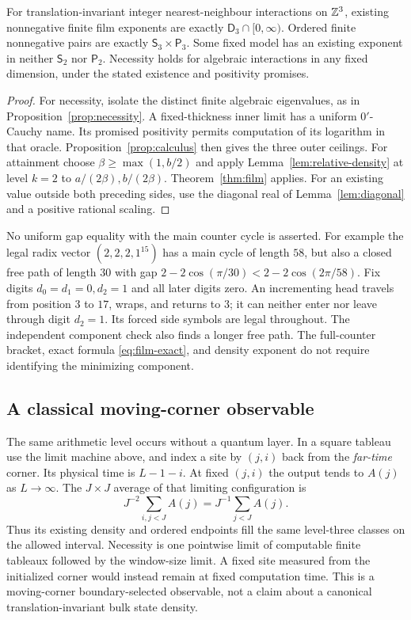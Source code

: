 \begin{corollary}\label{cor:film-classification}
For translation-invariant integer nearest-neighbour interactions on
$\mathbb Z^3$, existing nonnegative finite film exponents are exactly
$\mathsf D_3\cap[0,\infty)$. Ordered finite nonnegative pairs are
exactly $\mathsf S_3\times\mathsf P_3$. Some fixed model has an
existing exponent in neither $\mathsf S_2$ nor $\mathsf P_2$.
Necessity holds for algebraic interactions in any fixed dimension,
under the stated existence and positivity promises.
\end{corollary}
\begin{proof}
For necessity, isolate the distinct finite algebraic eigenvalues, as
in Proposition~\ref{prop:necessity}. A fixed-thickness inner limit has
a uniform $0'$-Cauchy name. Its promised positivity permits computation
of its logarithm in that oracle. Proposition~\ref{prop:calculus}
then gives the three outer ceilings. For attainment choose
$\beta\geq\max(1,b/2)$ and apply Lemma~\ref{lem:relative-density} at
level $k=2$ to $a/(2\beta),b/(2\beta)$. Theorem~\ref{thm:film} applies.
For an existing value outside both preceding sides, use the diagonal
real of Lemma~\ref{lem:diagonal} and a positive rational scaling.
\end{proof}

No uniform gap equality with the main counter cycle is asserted.
For example the legal radix vector $(2,2,2,1^{15})$ has a main cycle
of length $58$, but also a closed free path of length $30$ with gap
$2-2\cos(\pi/30)<2-2\cos(2\pi/58)$. Fix digits
$d_0=d_1=0,d_2=1$ and all later digits zero. An incrementing head
travels from position $3$ to $17$, wraps, and returns to $3$; it can
neither enter nor leave through digit $d_2=1$. Its forced side symbols
are legal throughout. The independent component check also finds a
longer free path. The full-counter bracket, exact formula
\eqref{eq:film-exact}, and density exponent do not require identifying
the minimizing component.

\subsection{A classical moving-corner observable}
The same arithmetic level occurs without a quantum layer. In a square
tableau use the limit machine above, and index a site by $(j,i)$ back
from the \emph{far-time} corner. Its physical time is $L-1-i$.
At fixed $(j,i)$ the output tends to $A(j)$ as $L\to\infty$.
The $J\times J$ average of that limiting configuration is
\[
 J^{-2}\sum_{i,j<J}A(j)=J^{-1}\sum_{j<J}A(j).
\]
Thus its existing density and ordered endpoints fill the same level-three
classes on the allowed interval. Necessity is one pointwise limit of
computable finite tableaux followed by the window-size limit. A fixed
site measured from the initialized corner would instead remain at
fixed computation time. This is a moving-corner boundary-selected
observable, not a claim about a canonical translation-invariant bulk
state density.

